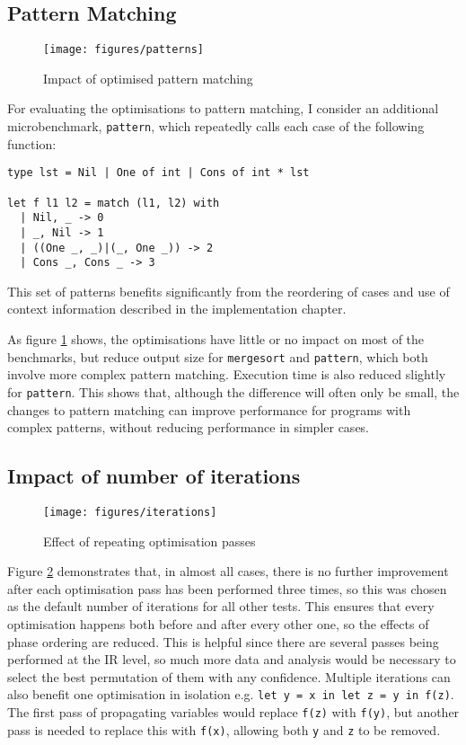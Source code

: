 \subsection{Pattern Matching}
\begin{figure}[H]
\texttt{[image: figures/patterns]}
\vspace{-0.8cm}
\caption{Impact of optimised pattern matching}
 \label{fig:patterns} 
\end{figure}

For evaluating the optimisations to pattern matching, I consider an additional microbenchmark, \verb|pattern|, which repeatedly calls each case of the following function:
\begin{verbatim}
type lst = Nil | One of int | Cons of int * lst

let f l1 l2 = match (l1, l2) with
  | Nil, _ -> 0
  | _, Nil -> 1
  | ((One _, _)|(_, One _)) -> 2
  | Cons _, Cons _ -> 3
\end{verbatim}
This set of patterns benefits significantly from the reordering of cases  and use of context information described in the implementation chapter. 


As figure \ref{fig:patterns} shows, the optimisations have little or no impact on most of the benchmarks, but reduce output size for \verb|mergesort| and \verb|pattern|, which both involve more complex pattern matching. Execution time is also reduced slightly for \verb|pattern|. This shows that, although the difference will often only be small, the changes to pattern matching can improve performance for programs with complex patterns, without reducing performance in simpler cases.

\subsection{Impact of number of iterations}
\vspace{-0.5cm}
\begin{figure}[H]
\hfill
\texttt{[image: figures/iterations]} \hfill
\vspace{-0.3cm}
\caption{Effect of repeating optimisation passes}
 \label{fig:iterations} 
\end{figure}

Figure \ref{fig:iterations} demonstrates that, in almost all cases, there is no further improvement after each optimisation pass has been performed three times, so this was chosen as the default number of iterations for all other tests. This ensures that every optimisation happens both before and after every other one, so the effects of phase ordering are reduced. This is helpful since there are several passes being performed at the IR level, so much more data and analysis would be necessary to select the best permutation of them with any confidence.
Multiple iterations can also benefit one optimisation in isolation e.g. \verb|let y = x in let z = y in f(z)|. The first pass of propagating variables would replace \verb|f(z)| with \verb|f(y)|, but another pass is needed to replace this with \verb|f(x)|, allowing both \verb|y| and \verb|z| to be removed.

